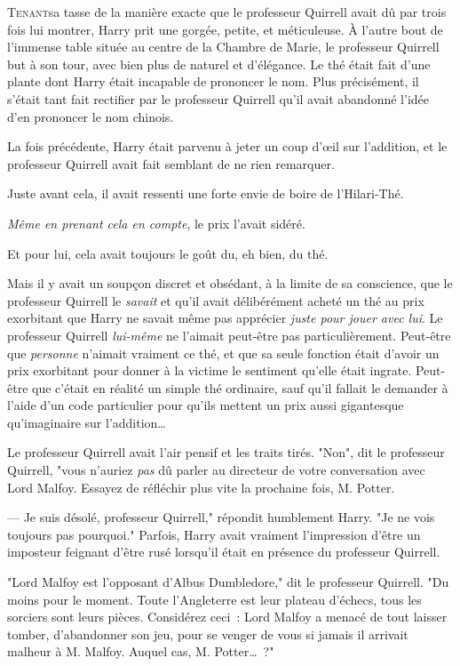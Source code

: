 
\lettrine{T}{enant}sa tasse de la manière exacte que le professeur Quirrell avait dû par trois fois lui montrer, Harry prit une gorgée, petite, et méticuleuse. À l'autre bout de l'immense table située au centre de la Chambre de Marie, le professeur Quirrell but à son tour, avec bien plus de naturel et d'élégance. Le thé était fait d'une plante dont Harry était incapable de prononcer le nom. Plus précisément, il s'était tant fait rectifier par le professeur Quirrell qu'il avait abandonné l'idée d'en prononcer le nom chinois.

La fois précédente, Harry était parvenu à jeter un coup d'œil sur l'addition, et le professeur Quirrell avait fait semblant de ne rien remarquer.

Juste avant cela, il avait ressenti une forte envie de boire de l'Hilari-Thé.

\emph{Même en prenant cela en compte}, le prix l'avait sidéré.

Et pour lui, cela avait toujours le goût du, eh bien, du thé.

Mais il y avait un soupçon discret et obsédant, à la limite de sa conscience, que le professeur Quirrell le \emph{savait} et qu'il avait délibérément acheté un thé au prix exorbitant que Harry ne savait même pas apprécier \emph{juste pour jouer avec lui}. Le professeur Quirrell \emph{lui-même} ne l'aimait peut-être pas particulièrement. Peut-être que \emph{personne} n'aimait vraiment ce thé, et que sa seule fonction était d'avoir un prix exorbitant pour donner à la victime le sentiment qu'elle était ingrate. Peut-être que c'était en réalité un simple thé ordinaire, sauf qu'il fallait le demander à l'aide d'un code particulier pour qu'ils mettent un prix aussi gigantesque qu'imaginaire sur l'addition…

Le professeur Quirrell avait l'air pensif et les traits tirés. "Non", dit le professeur Quirrell, "vous n'auriez \emph{pas} dû parler au directeur de votre conversation avec Lord Malfoy. Essayez de réfléchir plus vite la prochaine fois, M. Potter.

--- Je suis désolé, professeur Quirrell," répondit humblement Harry. "Je ne vois toujours pas pourquoi." Parfois, Harry avait vraiment l'impression d'être un imposteur feignant d'être rusé lorsqu'il était en présence du professeur Quirrell.

"Lord Malfoy est l'opposant d'Albus Dumbledore," dit le professeur Quirrell. "Du moins pour le moment. Toute l'Angleterre est leur plateau d'échecs, tous les sorciers sont leurs pièces. Considérez ceci~: Lord Malfoy a menacé de tout laisser tomber, d'abandonner son jeu, pour se venger de vous si jamais il arrivait malheur à M. Malfoy. Auquel cas, M. Potter…~?"

